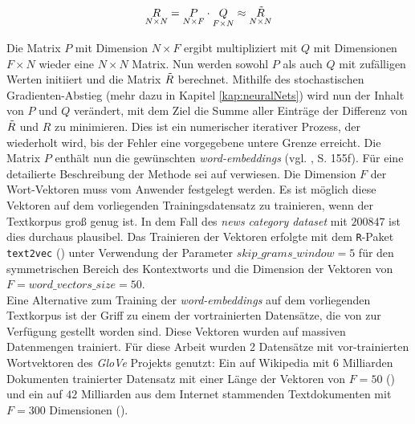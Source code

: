 \documentclass[a4paper,11pt]{article}
\begin{document}
\begin{equation*}
\underset{N \times N}{R} = \underset{N \times F}{P} \cdot \underset{F \times N}{Q} \approx  \underset{N \times N}{\Tilde{R}} 
\end{equation*}

Die Matrix $P$ mit Dimension $N \times F$ ergibt multipliziert mit $Q$ mit Dimensionen $F \times N$ wieder eine $N \times N$ Matrix. Nun werden sowohl $P$ als auch $Q$ mit zufälligen Werten initiiert und die Matrix $\Tilde{R}$ berechnet. Mithilfe des stochastischen Gradienten-Abstieg (mehr dazu in Kapitel \ref{kap:neuralNets}) wird nun der Inhalt von $P$ und $Q$ verändert, mit dem Ziel die Summe aller Einträge der Differenz von $\Tilde{R}$ und $R$ zu minimieren. Dies ist ein numerischer iterativer Prozess, der wiederholt wird, bis der Fehler eine vorgegebene untere Grenze erreicht. Die Matrix $P$ enthält nun die gewünschten \textit{word-embeddings} (vgl. \cite{keras}, S. 155f). Für eine detailierte Beschreibung der Methode sei auf \cite{glovePaper} verwiesen. Die Dimension $F$ der Wort-Vektoren muss vom Anwender festgelegt werden. Es ist möglich diese Vektoren auf dem vorliegenden Trainingsdatensatz zu trainieren, wenn der Textkorpus groß genug ist. In dem Fall des \textit{news category dataset} mit $200847$ ist dies durchaus plausibel. Das Trainieren der Vektoren erfolgte mit dem \texttt{R}-Paket \texttt{text2vec} (\cite{text2vec}) unter Verwendung der Parameter $skip\_grams\_window = 5$ für den symmetrischen Bereich des Kontextworts und die Dimension der Vektoren von $F = word\_vectors\_size = 50$.\\
Eine Alternative zum Training der \textit{word-embeddings} auf dem vorliegenden Textkorpus ist der Griff zu einem der vortrainierten Datensätze, die von \cite{gloveOnline} zur Verfügung gestellt worden sind. Diese Vektoren wurden auf massiven Datenmengen trainiert. Für diese Arbeit wurden 2 Datensätze mit vor-trainierten Wortvektoren des \textit{GloVe} Projekts genutzt: Ein auf Wikipedia mit $6$ Milliarden Dokumenten trainierter Datensatz mit einer Länge der Vektoren von $F = 50$ (\cite{gloveWiki}) und ein auf $42$ Milliarden aus dem Internet stammenden Textdokumenten mit $F = 300$ Dimensionen (\cite{gloveCommon}).\\
\end{document}
